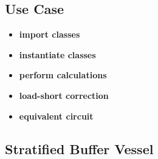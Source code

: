 % 

\subsection{Use Case}

 \begin{itemize}
	\item \textbf{import classes}
\end{itemize}

% 

 \begin{itemize}
	\item \textbf{instantiate classes}
\end{itemize}

% 

 \begin{itemize}
	\item \textbf{perform calculations}
\end{itemize}

% 

 \begin{itemize}
	\item \textbf{load-short correction}
\end{itemize}

% 

 \begin{itemize}
	\item \textbf{equivalent circuit}
\end{itemize}

% 

\subsection{Stratified Buffer Vessel}

